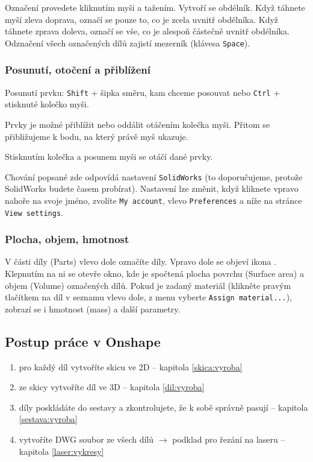 Označení provedete kliknutím myši a tažením. Vytvoří se obdélník. Když táhnete myší zleva doprava, označí se pouze to, co je zcela uvnitř obdélníka. 
Když táhnete zprava doleva, označí se vše, co je alespoň částečně uvnitř obdélníka. Odznačení všech označených dílů zajistí mezerník (klávesa {\tt Space}). 


\subsubsection{Posunutí, otočení a přiblížení}

Posunutí prvku: {\tt Shift}  + šipka směru, kam chceme posouvat nebo {\tt Ctrl} + stisknuté kolečko myši.  

Prvky je možné přiblížit nebo oddálit otáčením kolečka myši. Přitom se přibližujeme k bodu, na který právě myš ukazuje. 

Stisknutím kolečka a posunem myši se otáčí dané prvky. 

Chování popsané zde odpovídá nastavení \texttt{SolidWorks} (to doporučujeme, protože SolidWorks budete časem probírat). Nastavení lze změnit, když kliknete vpravo nahoře na svoje jméno, 
	zvolíte \texttt{My account}, vlevo \texttt{Preferences} a níže na stránce \texttt{View settings}.  


\subsubsection{Plocha, objem, hmotnost}

V části díly (Parts) vlevo dole označíte díly. Vpravo dole se objeví ikona . 
Klepnutím na ni se otevře okno, kde je spočtená plocha povrchu (Surface area) a objem (Volume) označených dílů. 
Pokud je zadaný materiál (klikněte pravým tlačítkem na díl v seznamu vlevo dole, z menu vyberte {\tt Assign material...}), zobrazí se i hmotnost (mass) a další parametry.


\subsection{Postup práce v Onshape}
 
\begin{enumerate}
	\item pro každý díl vytvoříte skicu ve 2D -- kapitola \ref{skica:vyroba}
	
	\item ze skicy vytvoříte díl ve 3D -- kapitola \ref{dil:vyroba}
	
	\item díly poskládáte do sestavy a zkontrolujete, že k sobě správně pasují -- kapitola \ref{sestava:vyroba}
	
	\item vytvoříte DWG soubor ze všech dílů $\rightarrow$ podklad pro řezání na laseru -- kapitola \ref{laser:vykresy}	
\end{enumerate}


